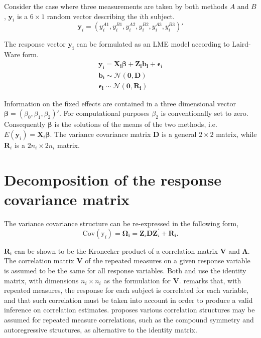 \documentclass[12pt, a4paper]{report}
\theoremstyle{plain}
\theoremstyle{definition}
\theoremstyle{remark}
\begin{document}
Consider the case where three measurements are taken by both methods $A$ and $B$, $\boldsymbol{y}_{i}$ is a $6 \times 1$ random vector describing the $i$th subject.
\[
\boldsymbol{y}_{i} = (y_{i}^{A1},y_{i}^{B1},y_{i}^{A2},y_{i}^{B2},y_{i}^{A3},y_{i}^{B3}) \prime
\]

The response vector $\boldsymbol{y_{i}}$ can be formulated as an LME model according to Laird-Ware form.
\begin{eqnarray*}
	\boldsymbol{y_{i}} = \boldsymbol{X_{i}\beta}  + \boldsymbol{Z_{i}b_{i}} + \boldsymbol{\epsilon_{i}}\\
	\boldsymbol{b_{i}} \sim \mathcal{N}(\boldsymbol{0,D})\\
	\boldsymbol{\epsilon_{i}} \sim \mathcal{N}(\boldsymbol{0,R_{i}})
\end{eqnarray*}

Information on the fixed effects are contained in a three dimensional vector $\boldsymbol{\beta} = (\beta_{0},\beta_{1},\beta_{2})\prime$. For computational purposes $\beta_{2}$ is conventionally set to zero. Consequently $\boldsymbol{\beta}$ is the solutions of the means of the two methods, i.e. $E(\boldsymbol{y}_{i})  = \boldsymbol{X}_{i}\boldsymbol{\beta}$. The variance covariance matrix $\boldsymbol{D}$ is a general $2 \times 2$ matrix, while $\boldsymbol{R}_{i}$ is a $2n_{i} \times 2n_{i}$ matrix.

\section{Decomposition of the response covariance matrix}

The variance covariance structure can be re-expressed in the following form,
\[
\mbox{Cov}(\mbox{y}_{i}) = \boldsymbol{\Omega_{i}} = \boldsymbol{Z}_{i}\boldsymbol{D}\boldsymbol{Z}_{i}^\prime + \boldsymbol{R_{i}}.
\]

$\boldsymbol{R_{i}}$ can be shown to be the Kronecker product of a correlation matrix $\boldsymbol{V}$ and $\boldsymbol{\Lambda}$. The correlation matrix $\boldsymbol{V}$ of the repeated measures on a given response variable is assumed to be the same for all response variables. Both \citet{hamlett} and \citet{lam} use the identity matrix, with dimensions $n_{i} \times n_{i}$ as the formulation for $\boldsymbol{V}$. \citet{roy} remarks that, with repeated measures, the response for each subject is correlated for each variable, and that such correlation must be taken into account in order to produce a valid inference on correlation estimates.  \citet{roy2006} proposes various correlation structures may be assumed for repeated measure correlations, such as the compound symmetry and autoregressive structures, as alternative to the identity matrix.
\end{document}
